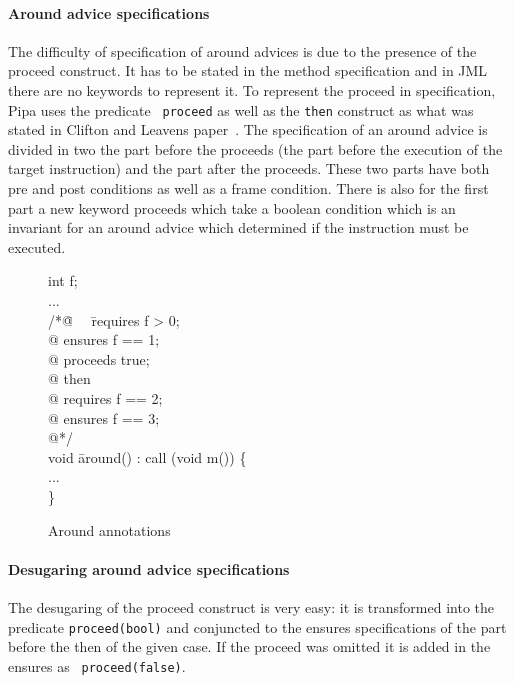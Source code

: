 \paragraph{Around advice specifications} 
The difficulty of specification of around advices is due to the
presence of the proceed construct. It has to be stated in the method
specification and in JML there are no keywords to represent it. To
represent the proceed in specification, Pipa uses the predicate {\tt
proceed} as well as the {\tt then} construct as what was stated in
Clifton and Leavens paper~\cite{clifton02spectators}.  The
specification of an around advice is divided in two the part before
the proceeds (the part before the execution of the target instruction)
and the part after the proceeds. These two parts have both pre and
post conditions as well as a frame condition. There is also for the
first part a new keyword proceeds which take a boolean condition which
is an invariant for an around advice which determined if the
instruction must be executed.

\begin{figure}
\begin{center}\begin{minipage}{3cm}\bcode
int f;\\
...\\
/*\=@ \ \ \=requires f > 0;\+ \\
@ \>ensures f == 1;\\
@ \>proceeds true;\\
@ then\\
@ \> requires f == 2;\\
@ \> ensures f == 3;\\
@*/\-\\
void \= around() : call (void m()) \{\\
\>...\\
\} \ecode\end{minipage}\end{center}
\caption{Around annotations}
\label{arround_annot}
\end{figure}

\paragraph{Desugaring around advice specifications}
The desugaring of the proceed construct is very easy: it is
transformed into the predicate {\tt proceed(bool)} and conjuncted to
the ensures specifications of the part before the then of the given
case.  If the proceed was omitted it is added in the ensures as {\tt
proceed(false)}.

